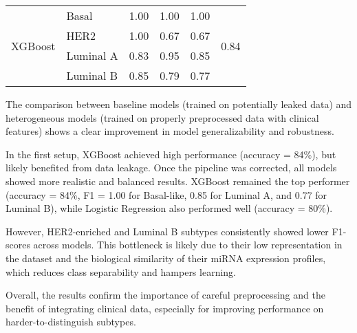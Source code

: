\begin{table}
{\begin{tabular}{llrrrr}
      \midrule
      \multirow{4}{*}{XGBoost}
                     & Basal          & 1.00               & 1.00            & 1.00              & \multirow{4}{*}{0.84} \\
                     & HER2           & 1.00               & 0.67            & 0.67              &                       \\
                     & Luminal A      & 0.83               & 0.95            & 0.85              &                       \\
                     & Luminal B      & 0.85               & 0.79            & 0.77              &                       \\
      \bottomrule
    \end{tabular}
  }
\end{table}

The comparison between baseline models (trained on potentially leaked data) and
heterogeneous models (trained on properly preprocessed data with clinical
features) shows a clear improvement in model generalizability and robustness.

In the first setup, XGBoost achieved high performance (accuracy = 84\%), but
likely benefited from data leakage. Once the pipeline was corrected, all models
showed more realistic and balanced results. XGBoost remained the top performer
(accuracy = 84\%, F1 = 1.00 for Basal-like, 0.85 for Luminal A, and 0.77 for
Luminal B), while Logistic Regression also performed well (accuracy = 80\%).

However, HER2-enriched and Luminal B subtypes consistently showed lower
F1-scores across models. This bottleneck is likely due to their low
representation in the dataset and the biological similarity of their miRNA
expression profiles, which reduces class separability and hampers learning.

Overall, the results confirm the importance of careful preprocessing and the
benefit of integrating clinical data, especially for improving performance on
harder-to-distinguish subtypes.

